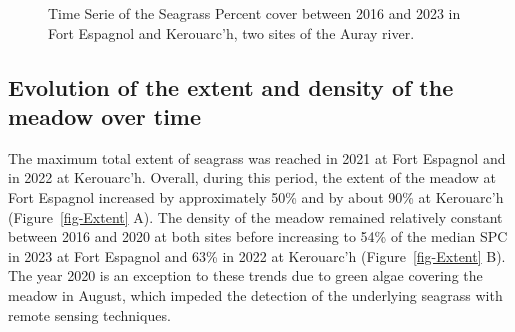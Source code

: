 \documentclass[
  number]{elsarticle}
\begin{document}
\label{cell-fig-Maps}
\begin{figure}[H]


\caption{\label{fig-Maps}Time Serie of the Seagrass Percent cover
between 2016 and 2023 in Fort Espagnol and Kerouarc'h, two sites of the
Auray river.}

\end{figure}%

\subsection{Evolution of the extent and density of the meadow over
time}\label{evolution-of-the-extent-and-density-of-the-meadow-over-time}

The maximum total extent of seagrass was reached in 2021 at Fort
Espagnol and in 2022 at Kerouarc'h. Overall, during this period, the
extent of the meadow at Fort Espagnol increased by approximately 50\%
and by about 90\% at Kerouarc'h (Figure~\ref{fig-Extent} A). The density
of the meadow remained relatively constant between 2016 and 2020 at both
sites before increasing to 54\% of the median SPC in 2023 at Fort
Espagnol and 63\% in 2022 at Kerouarc'h (Figure~\ref{fig-Extent} B). The
year 2020 is an exception to these trends due to green algae covering
the meadow in August, which impeded the detection of the underlying
seagrass with remote sensing techniques.
\end{document}
